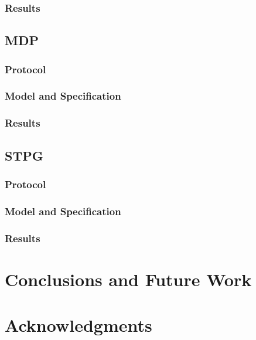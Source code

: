 \documentclass{llncs}
\begin{document}
\subsubsection{Results}

\subsection{MDP}
\subsubsection{Protocol}
\subsubsection{Model and Specification}
\subsubsection{Results}

\subsection{STPG}
\subsubsection{Protocol}
\subsubsection{Model and Specification}
\subsubsection{Results}

\section{Conclusions and Future Work}

\section{Acknowledgments}
\end{document}
